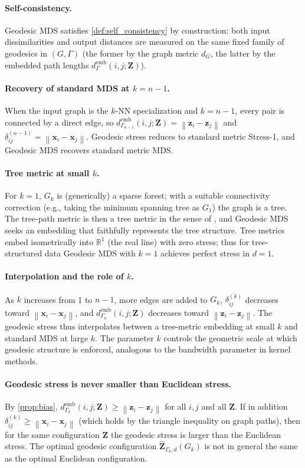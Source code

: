 \documentclass[twoside,11pt]{article}
\newcommand{\R}{\mathbb{R}}
\newcommand{\bx}{\mathbf{x}}
\newcommand{\bz}{\mathbf{z}}
\newcommand{\bZ}{\mathbf{Z}}
\newcommand{\norm}[1]{\left\|#1\right\|}
\newcommand{\demb}{d^{\mathrm{emb}}}
\newcommand{\Gk}{G_k}
\begin{document}
\paragraph{Self-consistency.}
Geodesic MDS satisfies \cref{def:self_consistency} by construction:
both input dissimilarities and output distances are measured on the same
fixed family of geodesics in $(G,\Gamma)$ (the former by the graph
metric $d_G$, the latter by the embedded path lengths
$\demb_{\Gamma}(i,j;\bZ)$).

\paragraph{Recovery of standard MDS at $k = n-1$.}
When the input graph is the $k$-NN specialization and $k = n-1$, every
pair is connected by a direct edge, so
$\demb_{\Gamma_{n-1}}(i,j;\bZ) = \norm{\bz_i - \bz_j}$ and
$\delta^{(n-1)}_{ij} = \norm{\bx_i - \bx_j}$.  Geodesic stress reduces to
standard metric Stress-1, and Geodesic MDS recovers standard metric MDS.

\paragraph{Tree metric at small $k$.}
For $k = 1$, $\Gk$ is (generically) a sparse forest; with a suitable
connectivity correction (e.g., taking the minimum spanning tree as
$G_1$) the graph is a tree.  The tree-path metric is then a tree metric in
the sense of \citet{dress1984trees}, and Geodesic MDS seeks an
embedding that faithfully represents the tree structure.  Tree metrics
embed isometrically into $\R^1$ (the real line) with zero stress;
thus for tree-structured data Geodesic MDS with $k=1$ achieves
perfect stress in $d=1$.

\paragraph{Interpolation and the role of $k$.}
As $k$ increases from 1 to $n-1$, more edges are added to $\Gk$,
$\delta^{(k)}_{ij}$ decreases toward $\norm{\bx_i - \bx_j}$, and
$\demb_{\Gamma_k}(i,j;\bZ)$ decreases toward $\norm{\bz_i - \bz_j}$.  The
geodesic stress thus interpolates between a tree-metric embedding at small
$k$ and standard MDS at large $k$.  The parameter $k$ controls the
geometric scale at which geodesic structure is enforced, analogous to the
bandwidth parameter in kernel methods.

\paragraph{Geodesic stress is never smaller than Euclidean stress.}
By \cref{prop:bias}, $\demb_{\Gamma_k}(i,j;\bZ) \geq \norm{\bz_i - \bz_j}$
for all $i,j$ and all $\bZ$.  If in addition $\delta^{(k)}_{ij} \geq
\norm{\bx_i - \bx_j}$ (which holds by the triangle inequality on graph
paths), then for the same configuration $\bZ$ the geodesic stress is
larger than the Euclidean stress.  The optimal geodesic configuration
$\hat{\bZ}_{\Gamma_k,d}(\Gk)$ is not in general the same as the optimal
Euclidean configuration.
\end{document}
